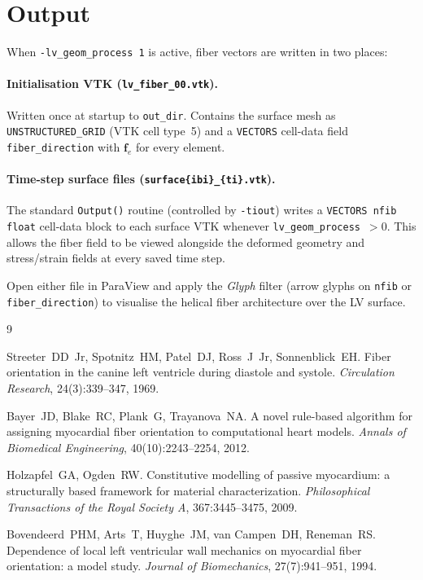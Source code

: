 \documentclass[11pt,a4paper]{article}
\newcommand{\bff}{\mathbf{f}}
\begin{document}
\section{Output}

When \texttt{-lv\_geom\_process~1} is active, fiber vectors are written in
two places:

\paragraph{Initialisation VTK (\texttt{lv\_fiber\_00.vtk}).}
Written once at startup to \texttt{out\_dir}.  Contains the surface mesh as
\texttt{UNSTRUCTURED\_GRID} (VTK cell type~5) and a \texttt{VECTORS} cell-data
field \texttt{fiber\_direction} with $\bff_e$ for every element.

\paragraph{Time-step surface files (\texttt{surface\{ibi\}\_\{ti\}.vtk}).}
The standard \texttt{Output()} routine (controlled by \texttt{-tiout}) writes
a \texttt{VECTORS nfib float} cell-data block to each surface VTK whenever
\texttt{lv\_geom\_process}~$> 0$.  This allows the fiber field to be viewed
alongside the deformed geometry and stress/strain fields at every saved
time step.

Open either file in ParaView and apply the \emph{Glyph} filter (arrow glyphs
on \texttt{nfib} or \texttt{fiber\_direction}) to visualise the helical fiber
architecture over the LV surface.

\begin{thebibliography}{9}

Streeter~DD~Jr, Spotnitz~HM, Patel~DJ, Ross~J~Jr, Sonnenblick~EH.
\newblock Fiber orientation in the canine left ventricle during diastole and
  systole.
\newblock \textit{Circulation Research}, 24(3):339--347, 1969.

Bayer~JD, Blake~RC, Plank~G, Trayanova~NA.
\newblock A novel rule-based algorithm for assigning myocardial fiber
  orientation to computational heart models.
\newblock \textit{Annals of Biomedical Engineering}, 40(10):2243--2254, 2012.

Holzapfel~GA, Ogden~RW.
\newblock Constitutive modelling of passive myocardium: a structurally based
  framework for material characterization.
\newblock \textit{Philosophical Transactions of the Royal Society A},
  367:3445--3475, 2009.

Bovendeerd~PHM, Arts~T, Huyghe~JM, van Campen~DH, Reneman~RS.
\newblock Dependence of local left ventricular wall mechanics on myocardial
  fiber orientation: a model study.
\newblock \textit{Journal of Biomechanics}, 27(7):941--951, 1994.

\end{thebibliography}
\end{document}
